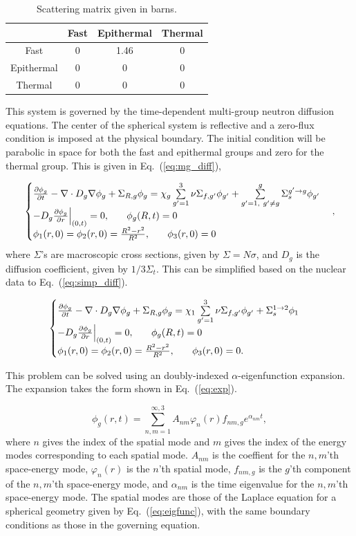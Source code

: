 \documentclass[12pt]{article}
\newcommand{\dxdy}[2]{\frac{\partial #1}{\partial #2}}
\newcommand{\be}{\begin{equation}}
\newcommand{\ee}{\end{equation}}
\newcommand{\pev}{\hspace{0.25in}}
\newcommand{\LEQ}[1]{\label{eq:#1}}
\newcommand{\EQ}[1]{Eq.~(\ref{eq:#1})}
\newcommand{\LTA}[1]{\label{ta:#1}}
\newcommand{\bt}{\begin{table}}
\newcommand{\et}{\end{table}}
\newcommand{\btb}{\begin{center}\begin{tabular}}
\newcommand{\etb}{\end{tabular}\end{center}}
\begin{document}
\bt[h] \centering 
	\caption{Scattering matrix given in barns.} 
	\btb{|c|c|c|c|}
		\hline
		\diagbox{From}{To}& Fast  & Epithermal  & Thermal  \\  \hline
		Fast  & 0 & 1.46 & 0 \\  \hline
		Epithermal & 0 & 0 & 0 \\  \hline
		Thermal  & 0 & 0 & 0 \\  \hline
	\etb \LTA{scat}
\et

This system is governed by the time-dependent multi-group neutron diffusion equations. 
The center of the spherical system is reflective and a zero-flux condition is 
 imposed at the physical boundary. 
The initial condition will be parabolic in space for both the fast and 
 epithermal groups and zero for the thermal group. 
This is given in \EQ{mg_diff},

\be
	\begin{cases}
		\dxdy{\phi_g}{t} - \nabla \cdot D_g \nabla \phi_g + \Sigma_{R,g} \phi_g 
			= \chi_g \sum\limits_{g'=1}^{3} \nu\Sigma_{f,g'} \phi_{g'} + 
		 	\sum\limits_{g'=1, \ g' \neq g}^g \Sigma_s^{g' \rightarrow g} \phi_{g'} \\
		-D_g \dxdy{\phi_g}{r} \Big\rvert_{(0,t)} = 0, \pev \phi_g(R,t) = 0 \\
			\phi_1(r,0) = \phi_2(r,0) = \frac{R^2 - r^2}{R^2}, \pev \phi_3(r,0) = 0
	\end{cases} ,
	\LEQ{mg_diff}
\ee 
where $\Sigma$'s are macroscopic cross sections, given by $\Sigma = N\sigma$, 
 and $D_g$ is the diffusion coefficient, given by $1/3\Sigma_t$. 
This can be simplified based on the nuclear data to \EQ{simp_diff}.

\be
	\begin{cases}
		\dxdy{\phi_g}{t} - \nabla \cdot D_g \nabla \phi_g + \Sigma_{R,g} \phi_g 
			= \chi_1 \sum\limits_{g'=1}^{3} \nu\Sigma_{f,g'} \phi_{g'} + 
			\Sigma_s^{1 \rightarrow 2} \phi_{1} \\
		-D_g \dxdy{\phi_g}{r} \Big\rvert_{(0,t)} = 0, \pev \phi_g(R,t) = 0 \\
		\phi_1(r,0) = \phi_2(r,0) = \frac{R^2 - r^2}{R^2}, \pev \phi_3(r,0) = 0.
	\end{cases} 
	\LEQ{simp_diff}
\ee

This problem can be solved using an doubly-indexed $\alpha$-eigenfunction expansion.  
The expansion takes the form shown in \EQ{exp}.

\be
	\phi_g(r, t) = \sum_{n, m = 1}^{\infty, 3} A_{nm} \varphi_n(r) f_{nm, g} e^{\alpha_{nm} t},
\LEQ{exp} \ee
where $n$ gives the index of the spatial mode and $m$ gives the index of the 
 energy modes corresponding to each spatial mode.
$A_{nm}$ is the coeffient for the $n,m$'th space-energy mode, $\varphi_n(r)$ is 
 the $n$'th spatial mode, $f_{nm, g}$ is the $g$'th component of the $n,m$'th 
 space-energy mode, and $\alpha_{nm}$ is the time eigenvalue for the $n,m$'th space-energy mode. 
The spatial modes are those of the Laplace equation for a spherical geometry 
 given by \EQ{eigfunc}, with the same boundary conditions as those in the governing equation.
\end{document}
